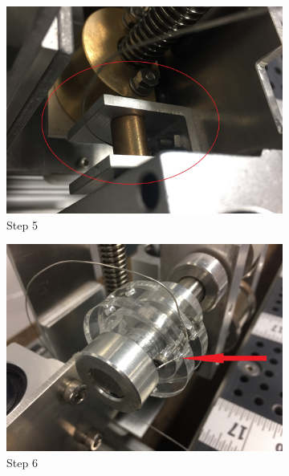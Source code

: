 \documentclass[titlepage,12pt,letter]{report}
\numberwithin{equation}{chapter}
\begin{document}
\begin{enumerate}[noitemsep,topsep=0pt]
\begin{figure}[H]
	\centering
	\begin{subfigure}[b]{.475\textwidth}
		\centering
		\includegraphics[width=\textwidth]{./Figures/Wire_mounting/5.jpg}
		\caption{Step 5}
	\end{subfigure}
	\begin{subfigure}[b]{.475\textwidth}
		\centering
		\includegraphics[width=\textwidth]{./Figures/Wire_mounting/6.jpg}
		\caption{Step 6}
	\end{subfigure}	
	\centering
	\begin{subfigure}[b]{.475\textwidth}
		\centering

\end{subfigure}
\end{figure}
\end{enumerate}
\end{document}
